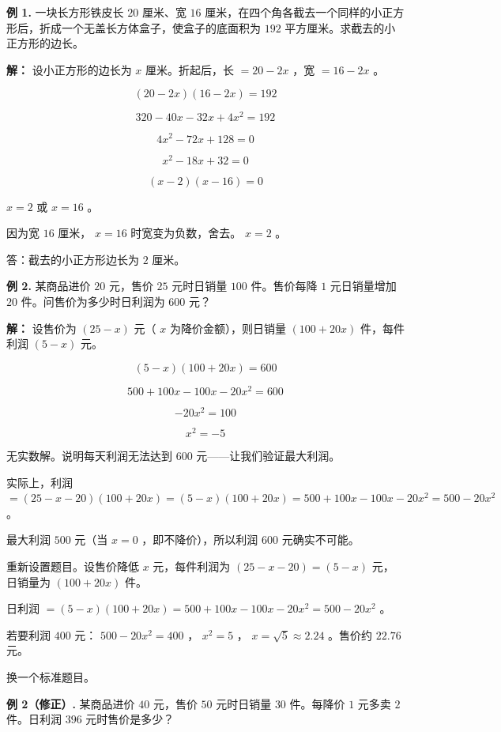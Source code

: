 \begin{workedexamples}


\textbf{例 1.} 一块长方形铁皮长 $20$ 厘米、宽 $16$ 厘米，在四个角各截去一个同样的小正方形后，折成一个无盖长方体盒子，使盒子的底面积为 $192$ 平方厘米。求截去的小正方形的边长。

\textbf{解：} 设小正方形的边长为 $x$ 厘米。折起后，长 $= 20 - 2x$ ，宽 $= 16 - 2x$ 。

\[
(20 - 2x)(16 - 2x) = 192
\]


\[
320 - 40x - 32x + 4x^2 = 192
\]


\[
4x^2 - 72x + 128 = 0
\]


\[
x^2 - 18x + 32 = 0
\]


\[
(x - 2)(x - 16) = 0
\]


$x = 2$ 或 $x = 16$ 。

因为宽 $16$ 厘米， $x = 16$ 时宽变为负数，舍去。 $x = 2$ 。

答：截去的小正方形边长为 $2$ 厘米。

\textbf{例 2.} 某商品进价 $20$ 元，售价 $25$ 元时日销量 $100$ 件。售价每降 $1$ 元日销量增加 $20$ 件。问售价为多少时日利润为 $600$ 元？

\textbf{解：} 设售价为 $(25 - x)$ 元（ $x$ 为降价金额），则日销量 $(100 + 20x)$ 件，每件利润 $(5 - x)$ 元。

\[
(5 - x)(100 + 20x) = 600
\]


\[
500 + 100x - 100x - 20x^2 = 600
\]


\[
-20x^2 = 100
\]


\[
x^2 = -5
\]


无实数解。说明每天利润无法达到 $600$ 元——让我们验证最大利润。

实际上，利润 $= (25 - x - 20)(100 + 20x) = (5 - x)(100 + 20x) = 500 + 100x - 100x - 20x^2 = 500 - 20x^2$ 。

最大利润 $500$ 元（当 $x = 0$ ，即不降价），所以利润 $600$ 元确实不可能。

重新设置题目。设售价降低 $x$ 元，每件利润为 $(25 - x - 20) = (5 - x)$ 元，日销量为 $(100 + 20x)$ 件。

日利润 $= (5 - x)(100 + 20x) = 500 + 100x - 100x - 20x^2 = 500 - 20x^2$ 。

若要利润 $400$ 元： $500 - 20x^2 = 400$ ， $x^2 = 5$ ， $x = \sqrt{5} \approx 2.24$ 。售价约 $22.76$ 元。

换一个标准题目。

\textbf{例 2（修正）.} 某商品进价 $40$ 元，售价 $50$ 元时日销量 $30$ 件。每降价 $1$ 元多卖 $2$ 件。日利润 $396$ 元时售价是多少？


\end{workedexamples}
